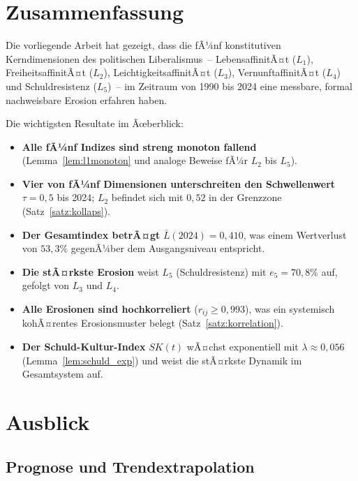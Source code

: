 ﻿\documentclass[a4paper,12pt]{article}
\theoremstyle{definition}
\begin{document}
\section{Zusammenfassung}

Die vorliegende Arbeit hat gezeigt, dass die fÃ¼nf konstitutiven Kerndimensionen des politischen Liberalismus~-- LebensaffinitÃ¤t ($L_1$), FreiheitsaffinitÃ¤t ($L_2$), LeichtigkeitsaffinitÃ¤t ($L_3$), VernunftaffinitÃ¤t ($L_4$) und Schuldresistenz ($L_5$)~-- im Zeitraum von 1990 bis 2024 eine messbare, formal nachweisbare Erosion erfahren haben.

Die wichtigsten Resultate im Ãœberblick:

\begin{itemize}
	\item \textbf{Alle fÃ¼nf Indizes sind streng monoton fallend} (Lemma~\ref{lem:l1monoton} und analoge Beweise fÃ¼r $L_2$ bis $L_5$).
	\item \textbf{Vier von fÃ¼nf Dimensionen unterschreiten den Schwellenwert} $\tau = 0{,}5$ bis 2024; $L_2$ befindet sich mit $0{,}52$ in der Grenzzone (Satz~\ref{satz:kollaps}).
	\item \textbf{Der Gesamtindex betrÃ¤gt} $\bar{L}(2024) = 0{,}410$, was einem Wertverlust von $53{,}3\%$ gegenÃ¼ber dem Ausgangsniveau entspricht.
	\item \textbf{Die stÃ¤rkste Erosion} weist $L_5$ (Schuldresistenz) mit $e_5 = 70{,}8\%$ auf, gefolgt von $L_3$ und $L_4$.
	\item \textbf{Alle Erosionen sind hochkorreliert} ($r_{ij} \geq 0{,}993$), was ein systemisch kohÃ¤rentes Erosionsmuster belegt (Satz~\ref{satz:korrelation}).
	\item \textbf{Der Schuld-Kultur-Index} $SK(t)$ wÃ¤chst exponentiell mit $\lambda \approx 0{,}056$ (Lemma~\ref{lem:schuld_exp}) und weist die stÃ¤rkste Dynamik im Gesamtsystem auf.
\end{itemize}

\section{Ausblick}

\subsection{Prognose und Trendextrapolation}
\end{document}
